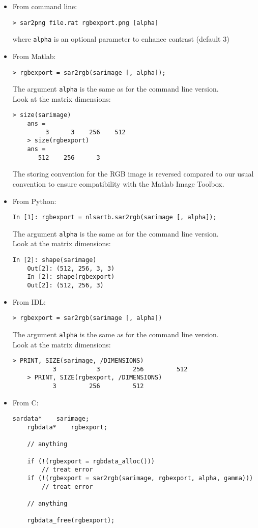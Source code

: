 \documentclass[10pt,french,english,a4paper]{article}
\begin{document}
\begin{itemize}
\item From command line:
  \begin{Verbatim}[frame=single]
    > sar2png file.rat rgbexport.png [alpha]
  \end{Verbatim}
  where \texttt{alpha} is an optional parameter
  to enhance contrast (default 3)
\item From Matlab:
  \begin{Verbatim}[frame=single]
    > rgbexport = sar2rgb(sarimage [, alpha]);
  \end{Verbatim}
  The argument \texttt{alpha} is the same as for the command line version.\\
  Look at the matrix dimensions:
  \begin{Verbatim}[frame=single]
    > size(sarimage)
    ans =
         3      3    256    512
    > size(rgbexport)
    ans =
       512    256      3
  \end{Verbatim}
  The storing convention for the RGB image is reversed compared
  to our usual convention to ensure compatibility with
  the Matlab Image Toolbox.
\item From Python:
  \begin{Verbatim}[frame=single]
    In [1]: rgbexport = nlsartb.sar2rgb(sarimage [, alpha]);
  \end{Verbatim}
  The argument \texttt{alpha} is the same as for the command line version.\\
  Look at the matrix dimensions:
  \begin{Verbatim}[frame=single]
    In [2]: shape(sarimage)
    Out[2]: (512, 256, 3, 3)
    In [2]: shape(rgbexport)
    Out[2]: (512, 256, 3)
  \end{Verbatim}
\item From IDL:
  \begin{Verbatim}[frame=single]
    > rgbexport = sar2rgb(sarimage [, alpha])
  \end{Verbatim}
  The argument \texttt{alpha} is the same as for the command line version.\\
  Look at the matrix dimensions:
  \begin{Verbatim}[frame=single]
    > PRINT, SIZE(sarimage, /DIMENSIONS)
           3           3         256         512
    > PRINT, SIZE(rgbexport, /DIMENSIONS)
           3         256         512
  \end{Verbatim}
\item From C:
  \begin{Verbatim}[frame=single]
    sardata*    sarimage;
    rgbdata*    rgbexport;

    // anything

    if (!(rgbexport = rgbdata_alloc()))
        // treat error
    if (!(rgbexport = sar2rgb(sarimage, rgbexport, alpha, gamma)))
        // treat error

    // anything

    rgbdata_free(rgbexport);
  \end{Verbatim}
\end{itemize}
\end{document}
